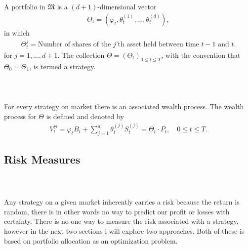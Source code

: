 \documentclass{beamer}
\numberwithin{equation}{section}
\begin{document}
\begin{frame}\frametitle{{\normalsize \secname} \\ {\large \subsecname}}
    \begin{definition}
        A portfolio in $\mathfrak{M}$ is a $(d + 1)$-dimensional vector
        \begin{align}
            \Theta_t = \left(\varphi_t, \theta_t^{(1)}, \ldots, \theta_t^{(d)}\right),
        \end{align}
        in which
        \begin{align}
            \Theta_t^j = \text{Number of shares of the $j$'th asset held between time $t-1$ and $t$}.
        \end{align}
        for $j = 1, \ldots, d + 1$.
        The collection $\Theta = \left( \Theta_t \right)_{0 \leq t \leq T}$, with the convention that $\Theta_0 = \Theta_1$, is termed a strategy.
    \end{definition}
\end{frame}

\begin{frame}\frametitle{{\normalsize \secname} \\ {\large \subsecname}}
    For every strategy on market there is an associated wealth process.
    The wealth process for $\Theta$ is defined and denoted by
    \begin{align}
        V_t^{\Theta} = \varphi_t B_t + \sum_{j = 1}^d \theta_t^{(j)} S_t^{(j)} = \Theta_t \cdot P_t, \quad 0 \leq t \leq T.    
    \end{align}
\end{frame}

\subsection{Risk Measures}

\begin{frame}\frametitle{{\normalsize \secname} \\ {\large \subsecname}}
    Any strategy on a given market inherently carries a risk because the return is random, there is in other words no way to predict our profit or losses with certainty.
    There is no one way to measure the risk associated with a strategy, however in the next two sections i will explore two approaches.
    Both of these is based on portfolio allocation as an optimization problem.
\end{frame}
\end{document}
